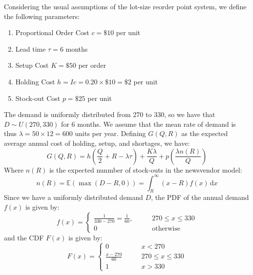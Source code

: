 \documentclass[12pt]{article}
\begin{document}

Considering the usual assumptions of the lot-size reorder point system, we define the following parameters: \begin{enumerate}
    \item Proportional Order Cost $c = \$10$ per unit 
    \item Lead time $\tau = 6$ months 
    \item Setup Cost $K = \$50$ per order
    \item Holding Cost $h = Ic =  0.20 \times \$10  = \$2$ per unit
    \item Stock-out Cost $p = \$25$ per unit 
\end{enumerate} The demand is uniformly distributed from 270 to 330, so we have that $D \sim U(270, 330)$ for 6 months. We assume that the mean rate of demand is thus $\lambda = 50 \times 12 = 600$ units per year. Defining $G(Q,R)$ as the expected average annual cost of holding, setup, and shortages, we have: \begin{equation}
    G(Q,R) = h\left( \frac{Q}{2} + R - \lambda \tau \right) + \frac{K\lambda}{Q} + p\left( \frac{\lambda n(R)}{Q} \right)
\end{equation} Where $n(R)$ is the expected nunmber of stock-outs in the newsvendor model: \begin{equation}
    n(R) = \mathbb{E}(\max (D-R, 0)) = \int_{R}^{\infty} (x - R)f(x) \, \mathrm{d}x
\end{equation} Since we have a uniformly distributed demand $D$, the PDF of the annual demand $f(x)$ is given by: \begin{equation*}\label{eq:2-nr}
    f(x) = \begin{cases}
        \displaystyle\frac{1}{330 - 270} = \frac{1}{60}, \qquad & 270 \leq x \leq 330 \\ 
        0 \qquad & \text{otherwise}
    \end{cases}
\end{equation*} and the CDF $F(x)$ is given by: \begin{equation*}
    F(x) = \begin{cases}
        0 \qquad & x < 270 \\ 
        \displaystyle\frac{x-270}{60} \qquad & 270\leq x\leq 330 \\ 
        1 \qquad & x > 330 
    \end{cases}
\end{equation*}
\end{document}

